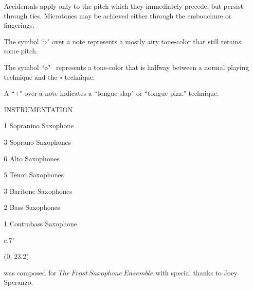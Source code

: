 \documentclass[10pt]{article}
\begin{document}
\begin{center}
Accidentals apply only to the pitch which they immediately precede, but persist through ties. Microtones may be achieved either through the embouchure or fingerings.
\end{center}

\begin{center}
The symbol ``$\circ$" over a note represents a mostly airy tone-color that still retains some pitch.
\end{center}

\begin{center}
The symbol ``\o" \ represents a tone-color that is halfway between a normal playing technique and the $\circ$ technique.
\end{center}

\begin{center}
A ``$+$" over a note indicates a ``tongue slap" or ``tongue pizz." technique.
\end{center}

\vspace*{0.5\baselineskip}

\begin{center}
\huge INSTRUMENTATION
\end{center}
\begin{center}
1 Sopranino Saxophone
\end{center}
\begin{center}
3 Soprano Saxophones
\end{center}
\begin{center}
6 Alto Saxophones
\end{center}
\begin{center}
5 Tenor Saxophones
\end{center}
\begin{center}
3 Baritone Saxophones
\end{center}
\begin{center}
2 Bass Saxophones
\end{center}
\begin{center}
1 Contrabass Saxophone
\end{center}

\vspace*{1\baselineskip}

\begin{center}
c.7'
\end{center}

\begin{textblock}{23.7}(0, 23.2)
\begin{center}
 was composed for $The \ Frost \ Saxophone \ Ensemble$ with special thanks to Joey Speranzo.
\end{center}
\end{textblock}
\end{document}
